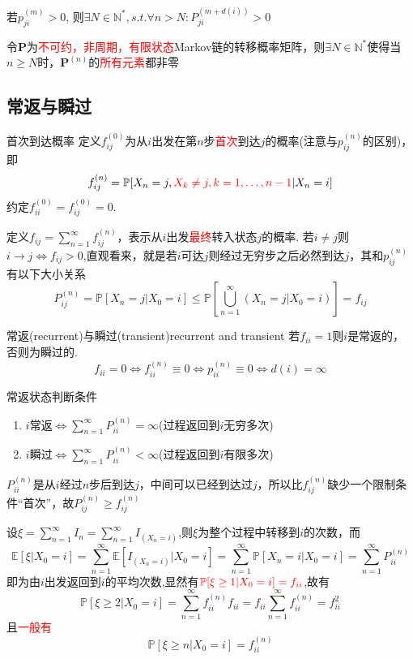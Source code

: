 \documentclass{elegantbook}
\newcommand\p{\mathbb{P}}
\newcommand\E{\mathbb{E}}
\begin{document}
\begin{corollary}{}{}
    若$p_{ji}^{(m)}>0$, 则$\exists N\in \mathbb{N}^* ,s.t. \forall n>N :P_{ji}^{(m+d(i))}>0$
\end{corollary}

\begin{proposition}{}{}
    令$\bm{P}$为\textcolor{red}{不可约，非周期，有限状态}Markov链的转移概率矩阵，则$\exists N\in \mathbb{N}^*$使得当$n\geq N$时，$\bm{P}^{(n)}$的\textcolor{red}{所有元素}都非零
\end{proposition}

\subsection{常返与瞬过}
\begin{definition}{首次到达概率}{}
    定义$f_{ij}^{(0)}$为从$i$出发在第$n$步\textcolor{red}{首次}到达$j$的概率(注意与$p_{ij}^{(n)}$的区别)，即
    \[f_{ij}^{(n)}=\p [X_n=j,\textcolor{red}{X_k\neq j,k=1,\dots ,n-1}|X_n=i]\]
    约定$f_{ii}^{(0)}=f_{ij}^{(0)}=0$.
    \par 定义$f_{ij}=\sum_{n=1}^{\infty}f_{ij}^{(n)}$，表示从$i$出发\textcolor{red}{最终}转入状态$j$的概率.
    若$i\neq j$则$i\rightarrow j \Leftrightarrow f_{ij}>0$,直观看来，就是若$i$可达$j$则经过无穷步之后必然到达$j$，其和$p_{ij}^{(n)}$有以下大小关系
    \[P_{ij}^{(n)}=\p[X_n=j|X_0=i]\leq \p[\bigcup_{n=1}^{\infty}(X_n=j|X_0=i)]=f_{ij}\]
\end{definition}
\begin{definition}{常返(recurrent)与瞬过(transient)}{recurrent and transient}
    若$f_{ii}=1$则$i$是常返的，否则为瞬过的.
    \[f_{ii}=0\Leftrightarrow f_{ii}^{(n)}\equiv 0 \Leftrightarrow p_{ii}^{(n)}\equiv 0\Leftrightarrow d(i)=\infty\]
\end{definition}

\begin{theorem}{常返状态判断条件}{}
    \begin{enumerate}
        \item $i$常返$\Leftrightarrow \sum_{n=1}^{\infty}P_{ii}^{(n)}=\infty$(过程返回到$i$无穷多次)
        \item $i$瞬过$\Leftrightarrow \sum_{n=1}^{\infty}P_{ii}^{(n)}<\infty$(过程返回到$i$有限多次)
    \end{enumerate}
    $P_{ii}^{(n)}$是从$i$经过$n$步后到达$j$，中间可以已经到达过$j$，所以比$f_{ij}^{(n)}$缺少一个限制条件“首次”，故$P_{ij}^{(n)}\geq f_{ij}^{(n)}$
\end{theorem}
\begin{remark}
    设$\xi =\sum_{n=1}^{\infty}I_n =\sum_{n=1}^{\infty}I_{(X_n=i)}$,则$\xi$为整个过程中转移到$i$的次数，而\[\E[\xi|X_0=i]=\sum_{n=1}^{\infty}\E[I_{(X_n=i)}|X_0=i]=\sum_{n=1}^{\infty}\p[X_n=i|X_0=i]=\sum_{n=1}^{\infty}P_{ii}^{(n)}\]
    即为由$i$出发返回到$i$的平均次数,显然有$\color{red}\p[\xi \geq 1|X_0=i]=f_{ii}$,故有
    \[\p[\xi \geq 2|X_0=i]=\sum_{n=1}^{\infty}f_{ii}^{(n)}f_{ii}=f_{ii}\sum_{n=1}^{\infty}f_{ii}^{(n)}=f_{ii}^2\]
    且\textcolor{red}{一般有}\[\p[\xi \geq n|X_0=i]=f_{ii}^{(n)}\]
\end{remark}
\end{document}
